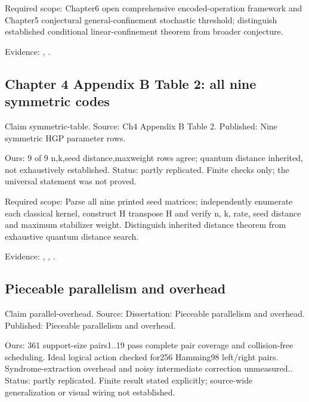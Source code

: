 Required scope: Chapter6 open comprehensive encoded-operation framework and Chapter5 conjectural general-confinement stochastic threshold; distinguish established conditional linear-confinement theorem from broader conjecture.

Evidence: \href{https://github.com/alectionary/vibe-math/blob/master/formalization/quintavalle-hgp/sources/browser-extraction.txt}{}, \href{https://github.com/alectionary/vibe-math/blob/master/formalization/quintavalle-hgp/availability.md}{}.
\subsection{Chapter 4 Appendix B Table 2: all nine symmetric codes}\label{claim:symmetric-table}
Claim symmetric-table. Source: Ch4 Appendix B Table 2. Published: Nine symmetric HGP parameter rows.

Ours: 9 of 9 n,k,seed distance,maxweight rows agree; quantum distance inherited, not exhaustively established. Status: partly replicated. Finite checks only; the universal statement was not proved.

Required scope: Parse all nine printed seed matrices; independently enumerate each classical kernel, construct H transpose H and verify n, k, rate, seed distance and maximum stabilizer weight. Distinguish inherited distance theorem from exhaustive quantum distance search.

Evidence: \href{https://github.com/alectionary/vibe-math/blob/master/formalization/quintavalle-hgp/sources/browser-extraction.txt}{}, \href{https://github.com/alectionary/vibe-math/blob/master/formalization/quintavalle-hgp/availability.md}{}, \href{https://github.com/alectionary/vibe-math/blob/master/formalization/quintavalle-hgp/results/exact_checks.json}{}.
\subsection{Pieceable parallelism and overhead}\label{claim:parallel-overhead}
Claim parallel-overhead. Source: Dissertation: Pieceable parallelism and overhead. Published: Pieceable parallelism and overhead.

Ours: 361 support-size pairs1..19 pass complete pair coverage and collision-free scheduling. Ideal logical action checked for256 Hamming98 left/right pairs. Syndrome-extraction overhead and noisy intermediate correction unmeasured.. Status: partly replicated. Finite result stated explicitly; source-wide generalization or visual wiring not established.

